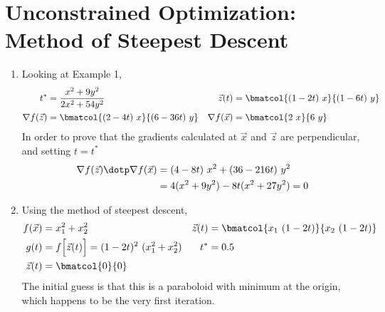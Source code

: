 \section{Unconstrained Optimization: Method of Steepest Descent}

\begin{enumerate}
    \item Looking at Example 1,
          \begin{align}
              t^*               & = \frac{x^2 + 9y^2}{2x^2 + 54y^2}     &
              \vec{z}(t)        & = \bmatcol{(1-2t)\ x}{(1-6t)\ y}        \\
              \nabla f(\vec{z}) & = \bmatcol{(2 - 4t)\ x}{(6 - 36t)\ y} &
              \nabla f(\vec{x}) & = \bmatcol{2\ x}{6\ y}
          \end{align}
          In order to prove that the gradients calculated at $ \vec{x} $ and $ \vec{z} $
          are perpendicular, and setting $ t = t^* $
          \begin{align}
              \nabla f(\vec{z}) \dotp \nabla f(\vec{x})
               & = (4 - 8t)\ x^2 + (36 - 216t)\ y^2    \\
               & = 4(x^2 + 9y^2) - 8t(x^2 + 27y^2) = 0
          \end{align}

    \item Using the method of steepest descent,
          \begin{align}
              f(\vec{x}) & = x_1^2 + x_2^2                                     &
              \vec{z}(t) & = \bmatcol{x_1\ (1 - 2t)}{x_2\ (1 - 2t)}              \\
              g(t)       & = f\Big[\vec{z}(t)\Big] = (1-2t)^2\ (x_1^2 + x_2^2) &
              t^*        & = 0.5                                                 \\
              \vec{z}(t) & = \bmatcol{0}{0}
          \end{align}
          The initial guess is that this is a paraboloid with minimum at the origin,
          which happens to be the very first iteration.


\end{enumerate}
